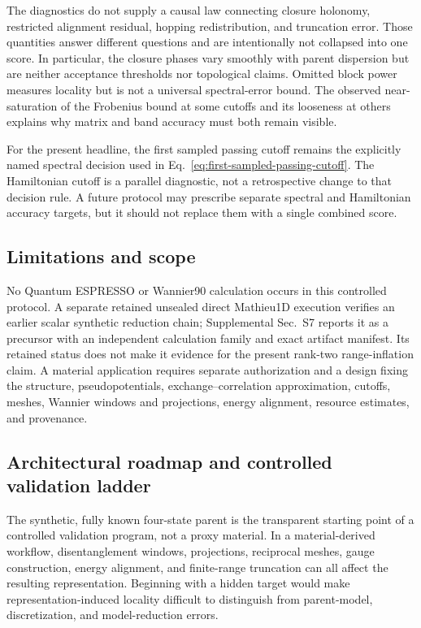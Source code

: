 \documentclass[aps,prb,reprint,amsmath,amssymb,longbibliography,floatfix]{revtex4-2}
\makeatletter
\def\label#1{\@bsphack
  \begingroup
  \UseHookWithArguments{label}{1}{#1}%
  \protected@write\@auxout{}%
    {\string\newlabel{#1}{{\@currentlabel}{\thepage}{\@currentlabelname}%
      {\@currentHref}{\@kernel@reserved@label@data}}}%
  \endgroup
  \@esphack}
\makeatother
\begin{document}
The diagnostics do not supply a causal law connecting closure holonomy, restricted
alignment residual, hopping redistribution, and truncation error. Those quantities
answer different questions and are intentionally not collapsed into one score. In
particular, the closure phases vary smoothly with parent dispersion but are neither
acceptance thresholds nor topological claims. Omitted block power measures locality but
is not a universal spectral-error bound. The observed near-saturation of the Frobenius
bound at some cutoffs and its looseness at others explains why matrix and band accuracy
must both remain visible.

For the present headline, the first sampled passing cutoff remains the explicitly named
spectral decision used in Eq.~\eqref{eq:first-sampled-passing-cutoff}. The Hamiltonian
cutoff is a parallel diagnostic, not a retrospective change to that decision rule. A
future protocol may prescribe separate spectral and Hamiltonian accuracy targets, but it
should not replace them with a single combined score.

\subsection{Limitations and scope}

No Quantum ESPRESSO or Wannier90 calculation occurs in this controlled protocol. A
separate retained unsealed direct Mathieu1D execution verifies an earlier scalar
synthetic reduction chain; Supplemental Sec.~S7 reports it as a precursor with an
independent calculation family and exact artifact manifest. Its retained status does
not make it evidence for the present rank-two range-inflation claim. A material application requires separate authorization
and a design fixing the structure, pseudopotentials, exchange--correlation approximation,
cutoffs, meshes, Wannier windows and projections, energy alignment, resource estimates,
and provenance.

\subsection{Architectural roadmap and controlled validation ladder}
\label{sec:validation-ladder}

The synthetic, fully known four-state parent is the transparent starting point of a
controlled validation program, not a proxy material. In a material-derived workflow,
disentanglement windows, projections, reciprocal meshes, gauge construction, energy
alignment, and finite-range truncation can all affect the resulting representation.
Beginning with a hidden target would make representation-induced locality difficult to
distinguish from parent-model, discretization, and model-reduction errors.
\end{document}
